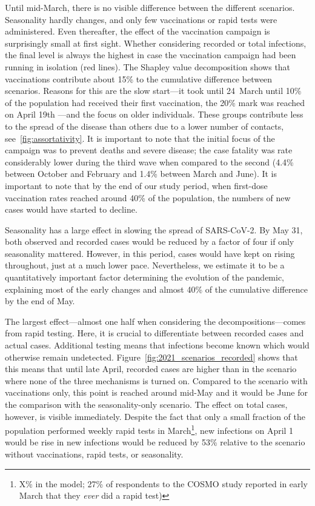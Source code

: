 Until mid-March, there is no visible difference between the different scenarios.
Seasonality hardly changes, and only few vaccinations or rapid tests were administered.
Even thereafter, the effect of the vaccination campaign is surprisingly small at first
sight. Whether considering recorded or total infections, the final level is always the
highest in case the vaccination campaign had been running in isolation (red lines). The
Shapley value decomposition shows that vaccinations contribute about
15\% to the cumulative difference between scenarios. Reasons for
this are the slow start---it took until 24~March until 10\% of the population had
received their first vaccination, the 20\% mark was reached on April 19th ---and the
focus on older individuals. These groups contribute less to the spread of the disease
than others due to a lower number of contacts, see~\ref{fig:assortativity}. It is
important to note that the initial focus of the campaign was to prevent deaths and
severe disease; the case fatality was rate considerably lower during the third wave when
compared to the second (4.4\% between October and February and 1.4\% between March and
June). It is important to note that by the end of our study period, when first-dose
vaccination rates reached around 40\% of the population, the numbers of new cases would
have started to decline.

Seasonality has a large effect in slowing the spread of SARS-CoV-2. By May 31, both
observed and recorded cases would be reduced by a factor of four if only seasonality
mattered. However, in this period, cases would have kept on rising throughout, just at a
much lower pace. Nevertheless, we estimate it to be a quantitatively important factor
determining the evolution of the pandemic, explaining most of the early changes and
almost 40\% of the cumulative difference by the end of May.

The largest effect---almost one half when considering the decompositions---comes from
rapid testing. Here, it is crucial to differentiate between recorded cases and actual
cases. Additional testing means that infections become known which would otherwise
remain undetected. Figure~\ref{fig:2021_scenarios_recorded} shows that this means that
until late April, recorded cases are higher than in the scenario where none of the three
mechanisms is turned on. Compared to the scenario with vaccinations only, this point is
reached around mid-May and it would be June for the comparison with the seasonality-only
scenario. The effect on total cases, however, is visible immediately. Despite the fact
that only a small fraction of the population performed weekly rapid tests in
March\footnote{X\% in the model; 27\% of respondents to the COSMO study reported in
early March that they \textit{ever} did a rapid test)}, new
infections on April 1 would be rise in new infections would be reduced by 53\% relative
to the scenario without vaccinations, rapid tests, or seasonality.


